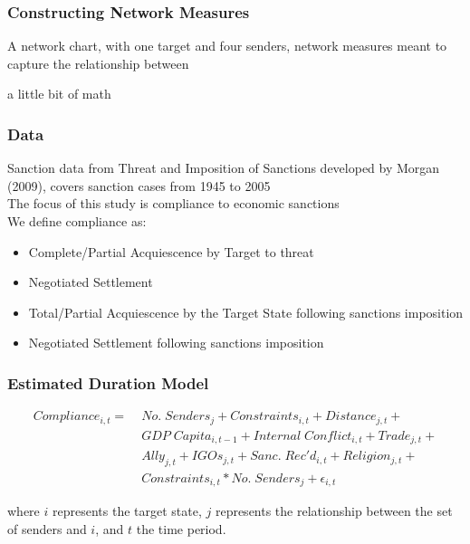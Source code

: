 \documentclass{beamer}
\begin{document}
\begin{frame}
\frametitle{Constructing Network Measures}

A network chart, with one target and four senders, network measures meant to capture the relationship between

a little bit of math

\end{frame}

\begin{frame}
\frametitle{Data}

Sanction data from Threat and Imposition of Sanctions developed by Morgan (2009), covers sanction cases from 1945 to 2005 \\
\vspace{0.5cm}
The focus of this study is compliance to economic sanctions \\
\vspace{0.5cm}
We define compliance as:

\begin{itemize}
	\item Complete/Partial Acquiescence by Target to threat
	\item Negotiated Settlement
	\item Total/Partial Acquiescence by the Target State following sanctions imposition
	\item Negotiated Settlement following sanctions imposition
\end{itemize}

\end{frame}

\begin{frame}
\frametitle{Estimated Duration Model}

\begin{align*}
Compliance_{i,t} =\; & No. \; Senders_{j} + Constraints_{i,t} + Distance_{j,t} + \\
 &GDP \; Capita_{i,t-1} +  Internal \; Conflict_{i,t} + Trade_{j,t} + \\
 &Ally_{j,t} + IGOs_{j,t} + Sanc. \; Rec'd_{i,t} + Religion_{j,t} + \\
 &Constraints_{i,t}*No. \; Senders_{j} + \epsilon_{i,t}
\end{align*}

where $i$ represents the target state, $j$ represents the relationship between the set of senders and $i$, and $t$ the time period.

\end{frame}
\end{document}
